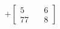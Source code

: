\documentclass[preview]{standalone}
\begin{document}
\begin{align*}
+\begin{bmatrix} 5 & \quad 6 \\ 77 & \quad 8 \end{bmatrix}
\end{align*}
\end{document}
